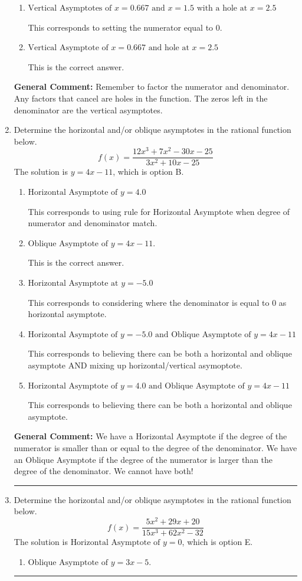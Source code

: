 \documentclass{extbook}[14pt]
\newcommand{\litem}[1]{\item #1

\rule{\textwidth}{0.4pt}}
\begin{document}
\begin{enumerate}
{\begin{enumerate}[label=\Alph*.]
This corresponds to mixing vertical and horizontal asymptotes.
\item \( \text{Vertical Asymptotes of } x = 0.667 \text{ and } x = 1.5 \text{ with a hole at } x = 2.5 \)

This corresponds to setting the numerator equal to 0.
\item \( \text{Vertical Asymptote of } x = 0.667 \text{ and hole at } x = 2.5 \)

This is the correct answer.
\end{enumerate}

\textbf{General Comment:} Remember to factor the numerator and denominator. Any factors that cancel are holes in the function. The zeros left in the denominator are the vertical asymptotes.
}
\litem{
Determine the horizontal and/or oblique asymptotes in the rational function below.
\[ f(x) = \frac{12x^{3} +7 x^{2} -30 x -25}{3x^{2} +10 x -25} \]The solution is \( y = 4x -11 \), which is option B.\begin{enumerate}[label=\Alph*.]
\item \( \text{Horizontal Asymptote of } y = 4.0  \)

This corresponds to using rule for Horizontal Asymptote when degree of numerator and denominator match.
\item \( \text{Oblique Asymptote of } y = 4x -11. \)

This is the correct answer.
\item \( \text{Horizontal Asymptote at } y = -5.0 \)

This corresponds to considering where the denominator is equal to 0 as horizontal asymptote.
\item \( \text{Horizontal Asymptote of } y = -5.0 \text{ and Oblique Asymptote of } y = 4x -11 \)

This corresponds to believing there can be both a horizontal and oblique asymptote AND mixing up horizontal/vertical asymoptote.
\item \( \text{Horizontal Asymptote of } y = 4.0 \text{ and Oblique Asymptote of } y = 4x -11 \)

This corresponds to believing there can be both a horizontal and oblique asymptote.
\end{enumerate}

\textbf{General Comment:} We have a Horizontal Asymptote if the degree of the numerator is smaller than or equal to the degree of the denominator. We have an Oblique Asymptote if the degree of the numerator is larger than the degree of the denominator. We cannot have both!
}
\litem{
Determine the horizontal and/or oblique asymptotes in the rational function below.
\[ f(x) = \frac{5x^{2} +29 x + 20}{15x^{3} +62 x^{2} -32} \]The solution is \( \text{Horizontal Asymptote of } y = 0 \), which is option E.\begin{enumerate}[label=\Alph*.]
\item \( \text{Oblique Asymptote of } y = 3x -5. \)


\end{enumerate}}
\end{enumerate}
\end{document}
